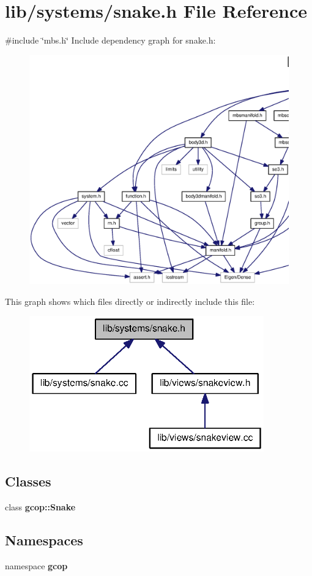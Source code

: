 \section{lib/systems/snake.h \-File \-Reference}
\label{snake_8h}
{\ttfamily \#include \char`\"{}mbs.\-h\char`\"{}}\*
\-Include dependency graph for snake.\-h\-:\nopagebreak
\begin{figure}[H]
\begin{center}
\leavevmode
\includegraphics[width=350pt]{snake_8h__incl}
\end{center}
\end{figure}
\-This graph shows which files directly or indirectly include this file\-:\nopagebreak
\begin{figure}[H]
\begin{center}
\leavevmode
\includegraphics[width=287pt]{snake_8h__dep__incl}
\end{center}
\end{figure}
\subsection*{\-Classes}
\begin{DoxyCompactItemize}
\item 
class {\bf gcop\-::\-Snake}
\end{DoxyCompactItemize}
\subsection*{\-Namespaces}
\begin{DoxyCompactItemize}
\item 
namespace {\bf gcop}
\end{DoxyCompactItemize}
